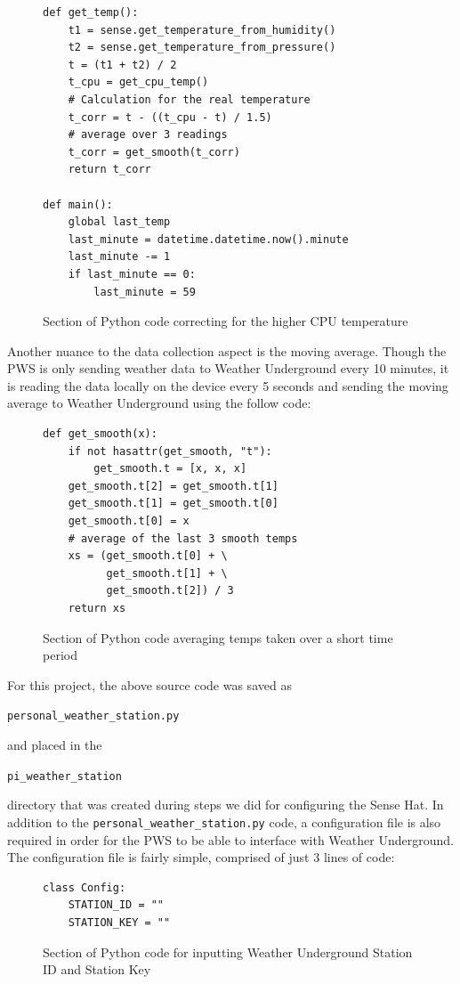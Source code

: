 \documentclass[sigconf]{acmart}
\begin{document}
\begin{figure}[htb]
\begin{verbatim}
def get_temp():
    t1 = sense.get_temperature_from_humidity()
    t2 = sense.get_temperature_from_pressure()
    t = (t1 + t2) / 2
    t_cpu = get_cpu_temp()
    # Calculation for the real temperature 
    t_corr = t - ((t_cpu - t) / 1.5)
    # average over 3 readings
    t_corr = get_smooth(t_corr)
    return t_corr

def main():
    global last_temp
    last_minute = datetime.datetime.now().minute
    last_minute -= 1
    if last_minute == 0:
        last_minute = 59
\end{verbatim}
\caption{Section of Python code correcting for the higher CPU temperature}\label{F:upload}
\end{figure}

Another nuance to the data collection aspect is the moving average. Though the PWS is only sending weather data to Weather Underground every 10 minutes, it is reading the data locally on the device every 5 seconds and sending the moving average to Weather Underground using the follow code:

\begin{figure}[htb]
\begin{verbatim}
def get_smooth(x):
    if not hasattr(get_smooth, "t"):
        get_smooth.t = [x, x, x]
    get_smooth.t[2] = get_smooth.t[1]
    get_smooth.t[1] = get_smooth.t[0]
    get_smooth.t[0] = x
    # average of the last 3 smooth temps
    xs = (get_smooth.t[0] + \
          get_smooth.t[1] + \
          get_smooth.t[2]) / 3
    return xs
\end{verbatim}
\caption{Section of Python code averaging temps taken over a short time period}\label{F:upload}
\end{figure}

For this project, the above source code was saved as 

\verb|personal_weather_station.py| 

and placed in the 

\verb|pi_weather_station| 

 directory that was created during steps we did for configuring the Sense Hat. In addition to the \verb|personal_weather_station.py| code, a configuration file is also required in order for the PWS to be able to interface with Weather Underground. The configuration file is fairly simple, comprised of just 3 lines of code:

\begin{figure}[htb]
\begin{verbatim}
class Config:
    STATION_ID = ""
    STATION_KEY = ""
\end{verbatim}
\caption{Section of Python code for inputting Weather Underground Station ID and Station Key}\label{F:upload}
\end{figure}
\end{document}
